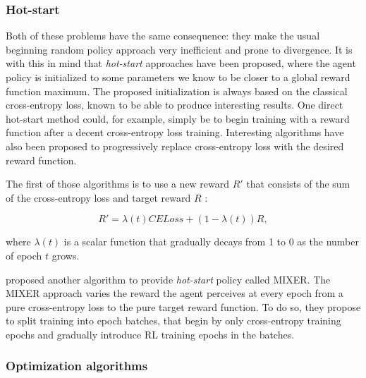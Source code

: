 \documentclass[twocolumn]{article}
\begin{document}
\subsubsection{Hot-start}

Both of these problems have the same consequence: they make the usual beginning random policy approach very inefficient and prone to divergence. It is with this in mind that \textit{hot-start} approaches have been proposed, where the agent policy is initialized to some parameters we know to be closer to a global reward function maximum. The proposed initialization is always based on the classical cross-entropy loss, known to be able to produce interesting results. One direct hot-start method could, for example, simply be to begin training with a reward function after a decent cross-entropy loss training. Interesting algorithms have also been proposed to progressively replace cross-entropy loss with the desired reward function.

The first of those algorithms is to use a new reward $R'$ that consists of the sum of the cross-entropy loss and target reward $R$ :

\begin{equation*}
R' = \lambda(t) \textit{CELoss} + (1-\lambda(t))R,
\end{equation*}

\noindent where $\lambda(t)$ is a scalar function that gradually decays from 1 to 0 as the number of epoch $t$ grows. 

\citep{ranzatoCAZ15} proposed another algorithm to provide \textit{hot-start} policy called MIXER. The MIXER approach varies the reward the agent perceives at every epoch from a pure cross-entropy loss to the pure target reward function. To do so, they propose to split training into epoch batches, that begin by only cross-entropy training epochs and gradually introduce RL training epochs in the batches. 

\subsubsection{Optimization algorithms}
\end{document}
